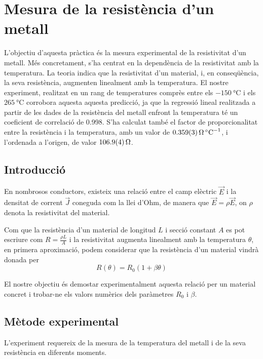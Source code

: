 \chapter{Mesura de la resistència d'un metall}
\begin{resum}
	L'objectiu d'aquesta pràctica és la mesura experimental de la resistivitat d'un metall. Més concretament, s'ha centrat en la dependència de la resistivitat amb la temperatura. La teoria indica que la resistivitat d'un material, i, en conseqüència, la seva resistència, augmenten linealment amb la temperatura. El nostre experiment, realitzat en un rang de temperatures comprès entre els $\SI{-150}{\celsius}$ i els $\SI{265}{\celsius}$ corrobora aquesta aquesta predicció, ja que la regressió lineal realitzada a partir de les dades de la resistència del metall enfront la temperatura té un coeficient de correlació de 0.998. S'ha calculat també el factor de proporcionalitat entre la resistència i la temperatura, amb un valor de $\data{0.359}{0.003}{\ohm.\celsius^{-1}}$, i l'ordenada a l'origen, de valor $\data{106.9}{0.4}{\ohm}$.
\end{resum}

\section{Introducció}
En nombrosos conductors, existeix una relació entre el camp elèctric $\vec{E}$ i la densitat de corrent $\vec{J}$ coneguda com la llei d'Ohm, de manera que $\vec{E}=\rho\vec{E}$, on $\rho$ denota la resistivitat del material.

Com que la resistència d'un material de longitud $L$ i secció constant $A$ es pot escriure com $R=\frac{\rho L}{A}$ i la resistivitat augmenta linealment amb la temperatura \( \theta \), en primera aproximació, podem considerar que la resistència d'un material vindrà donada per 
\begin{equation} \label{eq:regressio}
R(\theta)=R_0(1+\beta\theta)
\end{equation}

El nostre objectiu és demostar experimentalment aquesta relació per un material concret i trobar-ne els valors numèrics dels paràmetres $R_0$ i $\beta$.

\section{Mètode experimental}
L'experiment requereix de la mesura de la temperatura del metall i de la seva resistència en diferents moments.

